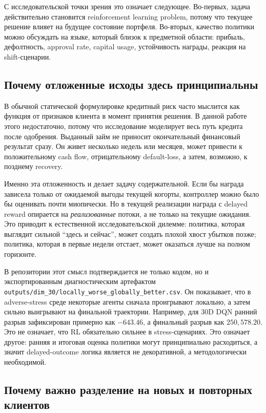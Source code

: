\documentclass[12pt,a4paper]{article}
\begin{document}
С исследовательской точки зрения это означает следующее. Во-первых, задача действительно становится reinforcement learning problem, потому что текущее решение влияет на будущее состояние портфеля. Во-вторых, качество политики можно обсуждать на языке, который близок к предметной области: прибыль, дефолтность, approval rate, capital usage, устойчивость награды, реакция на shift-сценарии.

\subsection{Почему отложенные исходы здесь принципиальны}

В обычной статической формулировке кредитный риск часто мыслится как функция от признаков клиента в момент принятия решения. В данной работе этого недостаточно, потому что исследование моделирует весь путь кредита после одобрения. Выданный займ не приносит окончательный финансовый результат сразу. Он живет несколько недель или месяцев, может привести к положительному cash flow, отрицательному default-loss, а затем, возможно, к позднему recovery.

Именно эта отложенность и делает задачу содержательной. Если бы награда зависела только от ожидаемой выгоды текущей когорты, контроллер можно было бы оценивать почти миопически. Но в текущей реализации награда с delayed reward опирается на \emph{реализованные} потоки, а не только на текущие ожидания. Это приводит к естественной исследовательской дилемме: политика, которая выглядит сильной ``здесь и сейчас'', может создать плохой хвост убытков позже; политика, которая в первые недели отстает, может оказаться лучше на полном горизонте.

В репозитории этот смысл подтверждается не только кодом, но и экспортированным диагностическим артефактом \texttt{outputs/dim\_30/locally\_worse\_globally\_better.csv}. Он показывает, что в adverse-stress среде некоторые агенты сначала проигрывают локально, а затем сильно выигрывают на финальной траектории. Например, для 30D DQN ранний разрыв зафиксирован примерно как $-643.46$, а финальный разрыв как $250{,}578.20$. Это не означает, что RL обязательно сильнее в stress-сценариях. Это означает другое: ранняя и итоговая оценка политики могут принципиально расходиться, а значит delayed-outcome логика является не декоративной, а методологически необходимой.

\subsection{Почему важно разделение на новых и повторных клиентов}
\end{document}
